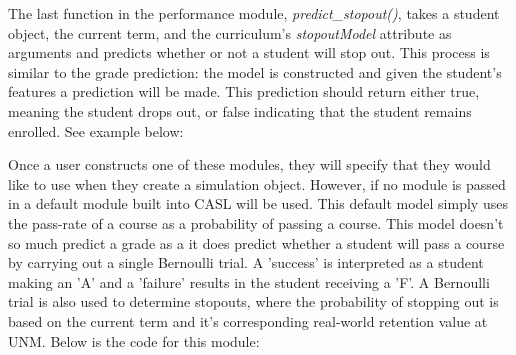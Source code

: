 \documentclass[botnum, fleqn]{unmeethesis}
\begin{document}
      

      The last function in the performance module, \textit{predict\_stopout()}, takes a student object, the current term, and the curriculum's \textit{stopoutModel} attribute as arguments and predicts whether or not a student will stop out. This process is similar to the grade prediction: the model is constructed and given the student's features a prediction will be made. This prediction should return either true, meaning the student drops out, or false indicating that the student remains enrolled. See example below:

      

      Once a user constructs one of these modules, they will specify that they would like to use when they create a simulation object. However, if no module is passed in a default module built into CASL will be used. This default model simply uses the pass-rate of a course as a probability of passing a course. This model doesn't so much predict a grade as a it does predict whether a student will pass a course by carrying out a single Bernoulli trial. A 'success' is interpreted as a student making an 'A' and a 'failure' results in the student receiving a 'F'. A Bernoulli trial is also used to determine stopouts, where the probability of stopping out is based on the current term and it's corresponding real-world retention value at UNM. Below is the code for this module:

      
  
\end{document}
